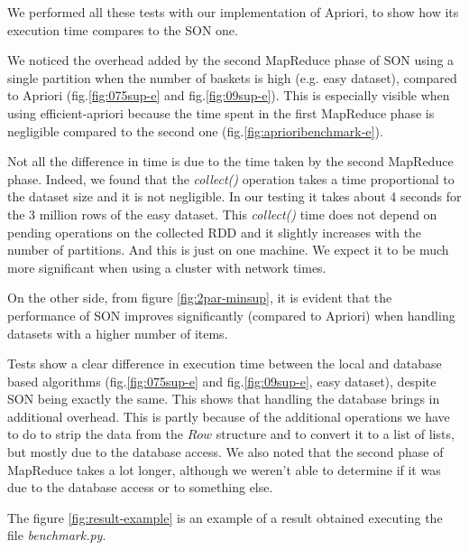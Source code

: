 \documentclass[a4paper]{article}
\begin{document}
	We performed all these tests with our implementation of Apriori, to show how its execution time compares to the SON one.
	
	We noticed the overhead added by the second MapReduce phase of SON using a single partition when the number of baskets is high (e.g. easy dataset), compared to Apriori (fig.\ref{fig:075sup-e} and fig.\ref{fig:09sup-e}). This is especially visible when using efficient-apriori because the time spent in the first MapReduce phase is negligible compared to the second one (fig.\ref{fig:aprioribenchmark-e}).

	Not all the difference in time is due to the time taken by the second MapReduce phase. Indeed, we found that the \textit{collect()} operation takes a time proportional to the dataset size and it is not
	negligible. In our testing it takes about 4 seconds for the 3 million rows of the easy dataset. This \textit{collect()} time does not depend on pending operations on the collected RDD and it slightly increases with the number of partitions. And this is just on one machine. We expect it to be much
	more significant when using a cluster with network times.

	On the other side, from figure \ref{fig:2par-minsup}, it is evident that the performance of SON improves significantly (compared to Apriori) when handling datasets with a higher number of items. %

	Tests show a clear difference in execution time between the local and database based algorithms (fig.\ref{fig:075sup-e} and fig.\ref{fig:09sup-e}, easy dataset), despite SON being exactly the same. This shows that handling the database brings in additional overhead.
	This is partly because of the additional operations we have to do to strip the data from the $Row$ structure and to convert it to a list of lists, but mostly due to the database access. We also noted that the second phase of MapReduce takes a lot longer, although we weren't able to determine if it was due to the database access or to something else.
	
	The figure \ref{fig:result-example} is an example of a result obtained executing the file \textit{benchmark.py}.
	
\end{document}

